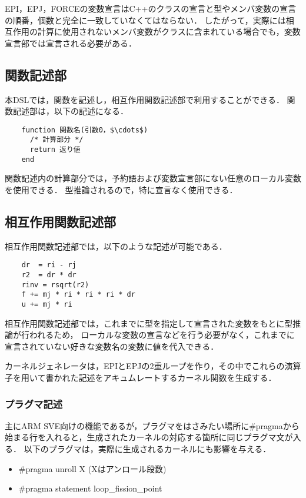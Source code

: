\documentclass{article}
\begin{document}
EPI，EPJ，FORCEの変数宣言はC++のクラスの宣言と型やメンバ変数の宣言の順番，個数と完全に一致していなくてはならない．
したがって，実際には相互作用の計算に使用されないメンバ変数がクラスに含まれている場合でも，変数宣言部では宣言される必要がある．

\subsection{関数記述部}
本DSLでは，関数を記述し，相互作用関数記述部で利用することができる．
関数記述部は，以下の記述になる．
\begin{verbatim}
	function 関数名(引数0，$\cdots$)
	  /* 計算部分 */
	  return 返り値
	end
\end{verbatim}

関数記述内の計算部分では，予約語および変数宣言部にない任意のローカル変数を使用できる．
型推論されるので，特に宣言なく使用できる．

\subsection{相互作用関数記述部} \label{subsec:kernel}
相互作用関数記述部では，以下のような記述が可能である．
\begin{verbatim}
	dr  = ri - rj
	r2  = dr * dr
	rinv = rsqrt(r2)
	f += mj * ri * ri * ri * dr
	u += mj * ri
\end{verbatim}

相互作用関数記述部では，これまでに型を指定して宣言された変数をもとに型推論が行われるため，
ローカルな変数の宣言などを行う必要がなく，これまでに宣言されていない好きな変数名の変数に値を代入できる．

カーネルジェネレータは，EPIとEPJの2重ループを作り，その中でこれらの演算子を用いて書かれた記述をアキュムレートするカーネル関数を生成する．

\subsubsection{プラグマ記述}
主にARM SVE向けの機能であるが，プラグマをはさみたい場所に\#pragmaから始まる行を入れると，生成されたカーネルの対応する箇所に同じプラグマ文が入る．
以下のプラグマは，実際に生成されるカーネルにも影響を与える．
 \begin{itemize}
  \item \#pragma unroll X (Xはアンロール段数)
  \item \#pragma statement loop\_fission\_point
 \end{itemize}
\end{document}
